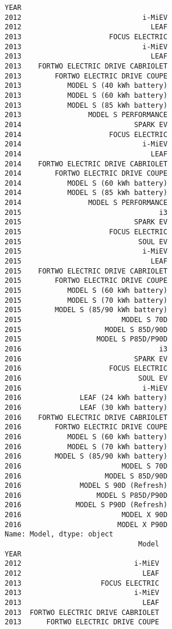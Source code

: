 \documentclass[11pt]{article}
\begin{document}
    \begin{Verbatim}[commandchars=\\\{\}]
YEAR
2012                             i-MiEV
2012                               LEAF
2013                     FOCUS ELECTRIC
2013                             i-MiEV
2013                               LEAF
2013    FORTWO ELECTRIC DRIVE CABRIOLET
2013        FORTWO ELECTRIC DRIVE COUPE
2013           MODEL S (40 kWh battery)
2013           MODEL S (60 kWh battery)
2013           MODEL S (85 kWh battery)
2013                MODEL S PERFORMANCE
2014                           SPARK EV
2014                     FOCUS ELECTRIC
2014                             i-MiEV
2014                               LEAF
2014    FORTWO ELECTRIC DRIVE CABRIOLET
2014        FORTWO ELECTRIC DRIVE COUPE
2014           MODEL S (60 kWh battery)
2014           MODEL S (85 kWh battery)
2014                MODEL S PERFORMANCE
2015                                 i3
2015                           SPARK EV
2015                     FOCUS ELECTRIC
2015                            SOUL EV
2015                             i-MiEV
2015                               LEAF
2015    FORTWO ELECTRIC DRIVE CABRIOLET
2015        FORTWO ELECTRIC DRIVE COUPE
2015           MODEL S (60 kWh battery)
2015           MODEL S (70 kWh battery)
2015        MODEL S (85/90 kWh battery)
2015                        MODEL S 70D
2015                    MODEL S 85D/90D
2015                  MODEL S P85D/P90D
2016                                 i3
2016                           SPARK EV
2016                     FOCUS ELECTRIC
2016                            SOUL EV
2016                             i-MiEV
2016              LEAF (24 kWh battery)
2016              LEAF (30 kWh battery)
2016    FORTWO ELECTRIC DRIVE CABRIOLET
2016        FORTWO ELECTRIC DRIVE COUPE
2016           MODEL S (60 kWh battery)
2016           MODEL S (70 kWh battery)
2016        MODEL S (85/90 kWh battery)
2016                        MODEL S 70D
2016                    MODEL S 85D/90D
2016              MODEL S 90D (Refresh)
2016                  MODEL S P85D/P90D
2016             MODEL S P90D (Refresh)
2016                        MODEL X 90D
2016                       MODEL X P90D
Name: Model, dtype: object
                                Model
YEAR                                 
2012                           i-MiEV
2012                             LEAF
2013                   FOCUS ELECTRIC
2013                           i-MiEV
2013                             LEAF
2013  FORTWO ELECTRIC DRIVE CABRIOLET
2013      FORTWO ELECTRIC DRIVE COUPE

\end{Verbatim}
\end{document}
